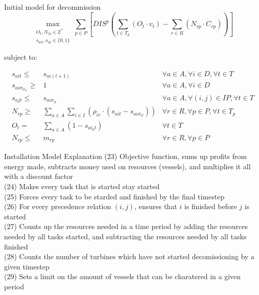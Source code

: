 \documentclass{beamer}
\begin{document}
\begin{frame}{Initial model for decommission}
\scriptsize
\begin{equation}
	\max_{\substack{O_t, N_{rp} \in \mathbb{Z}^* \\ 
	s_{ait}, o_{at} \in \{0, 1\}}} 
	\sum_{p \in P} [ DIS^p (\sum_{t\in T_p} (O_t \cdot v_t)  - \sum_{r\in R} (N_{rp} \cdot C_{rp})) ]
\end{equation}

\bigskip
subject to:

\begin{align}
s_{ait} \leq& s_{ai(t+1)}											&	\forall a \in A, \forall i \in D, \forall t \in T			\\
s_{ai\sigma_{it_N}} \geq& 1										&	\forall a \in A, \forall i \in D						\\
s_{ajt} \leq& s_{ai\sigma_{it}}										&	\forall a \in A, \forall (i, j) \in IP, \forall t \in T 			\\
N_{rp} \geq& \sum_{a \in A}\sum_{i\in I} (\rho_{ir} \cdot (s_{ait} - s_{ai\sigma_{it}}))		& 	\forall r \in R, \forall p \in P, \forall t \in T_p			\\
O_t =&  \sum_{a \in A} (1 - s_{ai_0t} )									& 	\forall t \in T								\\
N_{rp} \leq& m_{rp}											& 	\forall r \in R, \forall p \in P
\end{align}

\end{frame}

\begin{frame}{Installation Model Explanation}
(23) Objective function, sums up profits from energy made, subtracts money used on resources (vessels), and multiplies it all with a discount factor	\\
(24) Makes every task that is started stay started 	\\
(25) Forces every task to be starded and finished by the final timestep	\\
(26) For every precedence relation $(i, j)$, ensures that $i$ is finished before $j$ is started 	\\
(27) Counts up the resources needed in a time period by adding the resources needed by all tasks started, and subtracting the resources needed by all tasks finished	\\
(28) Counts the number of turbines which have not started decomissioning by a given timestep	\\
(29) Sets a limit on the amount of vessels that can be charatered in a given period
\end{frame}
\end{document}
